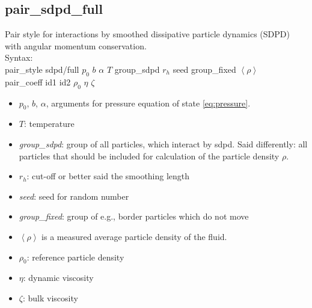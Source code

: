 \subsection{pair\_sdpd\_full}\label{sec:pair/sdpd/full}

Pair style for interactions by smoothed dissipative particle dynamics (SDPD) with angular momentum conservation.
\\[2ex]
Syntax:
\\[1ex]
pair\_style      sdpd/full $p_0$ $b$ $\alpha$ $T$ group\_sdpd $r_h$ seed group\_fixed $\left< \rho \right>$
\\[1ex]
pair\_coeff      id1 id2 $\rho_0$ $\eta$ $\zeta$

\begin{itemize}
\item $p_0$, $b$, $\alpha$, arguments for pressure equation of state \cref{eq:pressure}.
\item $T$: temperature
\item \textit{group\_sdpd}: group of all particles, which interact by sdpd. Said differently: all particles that should be included for calculation of the particle density $\rho$.
\item $r_h$: cut-off or better said the smoothing length
\item \textit{seed}: seed for random number
\item \textit{group\_fixed}: group of e.g., border particles which do not move
\item $\left< \rho \right>$ is a measured average particle density of the fluid.
\item $\rho_0$: reference particle density
\item $\eta$: dynamic viscosity
\item $\zeta$: bulk viscosity
\end{itemize}

